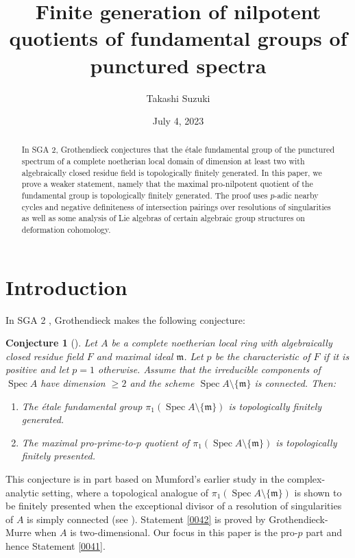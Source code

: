 \documentclass{amsart}
\title[Finite generation for punctured spectra]
	{Finite generation of nilpotent quotients of fundamental groups of punctured spectra}
\author{Takashi Suzuki}
\date{July 4, 2023}
\newtheorem{Conj}[Thm]{Conjecture}
\theoremstyle{remark}
\numberwithin{equation}{section}
\newcommand{\ideal}[1]{\mathfrak{#1}}
\DeclareMathOperator{\Spec}{Spec}
\begin{document}
\begin{abstract}
	In SGA 2, Grothendieck conjectures that
	the \'etale fundamental group of the punctured spectrum of a complete noetherian local domain
	of dimension at least two
	with algebraically closed residue field is topologically finitely generated.
	In this paper, we prove a weaker statement,
	namely that the maximal pro-nilpotent quotient of the fundamental group is topologically finitely generated.
	The proof uses $p$-adic nearby cycles and negative definiteness of intersection pairings
	over resolutions of singularities
	as well as some analysis of Lie algebras of certain algebraic group structures on deformation cohomology.
\end{abstract}

\maketitle

\tableofcontents


\section{Introduction}
\label{0043}

In SGA 2 \cite{Gro05}, Grothendieck makes the following conjecture:

\begin{Conj}[{\cite[Expos\'e XIII, Conjecture 3.1]{Gro05}}] \label{0017}
	Let $A$ be a complete noetherian local ring with algebraically closed residue field $F$
	and maximal ideal $\ideal{m}$.
	Let $p$ be the characteristic of $F$ if it is positive
	and let $p = 1$ otherwise.
	Assume that the irreducible components of $\Spec A$ have dimension $\ge 2$
	and the scheme $\Spec A \setminus \{\ideal{m}\}$ is connected.
	Then:
	\begin{enumerate}
		\item \label{0041}
			The \'etale fundamental group $\pi_{1}(\Spec A \setminus \{\ideal{m}\})$ is
			topologically finitely generated.
		\item \label{0042}
			The maximal pro-prime-to-$p$ quotient of $\pi_{1}(\Spec A \setminus \{\ideal{m}\})$
			is topologically finitely presented.
	\end{enumerate}
\end{Conj}

This conjecture is in part based on
Mumford's earlier study \cite{Mum61} in the complex-analytic setting,
where a topological analogue of $\pi_{1}(\Spec A \setminus \{\ideal{m}\})$
is shown to be finitely presented
when the exceptional divisor of a resolution of singularities of $A$ is simply connected
(see \cite[Section I, pp.11--12]{Mum61}).
Statement \eqref{0042} is proved by Grothendieck-Murre \cite[Theorem 9.2]{GM71}
when $A$ is two-dimensional.
Our focus in this paper is the pro-$p$ part and hence Statement \eqref{0041}.
\end{document}
